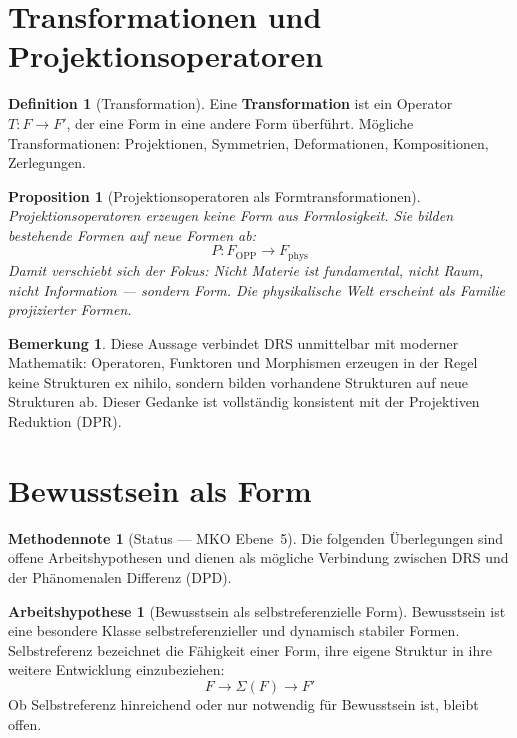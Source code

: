 \documentclass[11pt,a4paper]{article}
\theoremstyle{plain}
\newtheorem{proposition}{Proposition}[section]
\theoremstyle{definition}
\newtheorem{definition}{Definition}[section]
\newtheorem{remark}{Bemerkung}[section]
\newtheorem{methodennote}{Methodennote}[section]
\newtheorem{hypothese}{Arbeitshypothese}[section]
\begin{document}
\section{Transformationen und Projektionsoperatoren}

\begin{definition}[Transformation]
Eine \textbf{Transformation} ist ein Operator $T\colon F \rightarrow F'$, der eine
Form in eine andere Form \"{u}berf\"{u}hrt. M\"{o}gliche Transformationen: Projektionen,
Symmetrien, Deformationen, Kompositionen, Zerlegungen.
\end{definition}

\begin{proposition}[Projektionsoperatoren als Formtransformationen]
Projektionsoperatoren erzeugen keine Form aus Formlosigkeit. Sie bilden bestehende
Formen auf neue Formen ab:
\[
  P\colon F_{\mathrm{OPP}} \longrightarrow F_{\mathrm{phys}}
\]
Damit verschiebt sich der Fokus: Nicht Materie ist fundamental, nicht Raum, nicht
Information --- sondern Form. Die physikalische Welt erscheint als Familie projizierter
Formen.
\end{proposition}

\begin{remark}
Diese Aussage verbindet DRS unmittelbar mit moderner Mathematik: Operatoren, Funktoren
und Morphismen erzeugen in der Regel keine Strukturen ex nihilo, sondern bilden
vorhandene Strukturen auf neue Strukturen ab. Dieser Gedanke ist vollst\"{a}ndig
konsistent mit der Projektiven Reduktion (DPR).
\end{remark}

\section{Bewusstsein als Form}

\begin{methodennote}[Status --- MKO Ebene~5]
Die folgenden \"{U}berlegungen sind offene Arbeitshypothesen und dienen als m\"{o}gliche
Verbindung zwischen DRS und der Ph\"{a}nomenalen Differenz (DPD).
\end{methodennote}

\begin{hypothese}[Bewusstsein als selbstreferenzielle Form]
Bewusstsein ist eine besondere Klasse selbstreferenzieller und dynamisch stabiler
Formen. Selbstreferenz bezeichnet die F\"{a}higkeit einer Form, ihre eigene Struktur
in ihre weitere Entwicklung einzubeziehen:
\[
  F \rightarrow \Sigma(F) \rightarrow F'
\]
Ob Selbstreferenz hinreichend oder nur notwendig f\"{u}r Bewusstsein ist, bleibt offen.
\end{hypothese}
\end{document}
